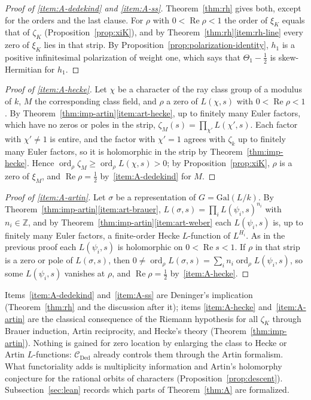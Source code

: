 \documentclass[11pt]{amsart}
\theoremstyle{plain}
\theoremstyle{definition}
\theoremstyle{remark}
\numberwithin{equation}{section}
\newcommand{\Z}{\mathbb{Z}}
\newcommand{\cC}{\mathcal{C}}
\DeclareMathOperator{\Rea}{Re}
\DeclareMathOperator{\ord}{ord}
\renewcommand{\Re}{\Rea}
\begin{document}
\begin{proof}[Proof of \ref{item:A-dedekind} and \ref{item:A-ss}]
Theorem~\ref{thm:rh} gives both, except for the orders and the last
clause. For $\rho$ with $0<\Re\rho<1$ the order of $\xi_K$ equals that
of $\zeta_K$ (Proposition~\ref{prop:xiK}), and by
Theorem~\ref{thm:rh}\ref{item:rh-line} every zero of $\xi_K$ lies in
that strip. By Proposition~\ref{prop:polarization-identity}, $h_1$ is a
positive infinitesimal polarization of weight one, which says that
$\Theta_1-\tfrac12$ is skew-Hermitian for $h_1$.
\end{proof}

\begin{proof}[Proof of \ref{item:A-hecke}]
Let $\chi$ be a character of the ray class group of a modulus of $k$,
$M$ the corresponding class field, and $\rho$ a zero of $L(\chi,s)$
with $0<\Re\rho<1$. By
Theorem~\ref{thm:imp-artin}\ref{item:art-hecke}, up to finitely many
Euler factors, which have no zeros or poles in the strip,
$\zeta_M(s)=\prod_{\chi'}L(\chi',s)$. Each factor with $\chi'\ne1$ is
entire, and the factor with $\chi'=1$ agrees with $\zeta_k$ up to
finitely many Euler factors, so it is holomorphic in the strip by
Theorem~\ref{thm:imp-hecke}. Hence $\ord_\rho\zeta_M\ge\ord_\rho
L(\chi,s)>0$; by Proposition~\ref{prop:xiK}, $\rho$ is a zero of
$\xi_M$, and $\Re\rho=\tfrac12$ by~\ref{item:A-dedekind} for $M$.
\end{proof}

\begin{proof}[Proof of \ref{item:A-artin}]
Let $\sigma$ be a representation of $G=\mathrm{Gal}(L/k)$. By
Theorem~\ref{thm:imp-artin}\ref{item:art-brauer}, $L(\sigma,s)=
\prod_iL(\psi_i,s)^{n_i}$ with $n_i\in\Z$, and
by Theorem~\ref{thm:imp-artin}\ref{item:art-weber} each
$L(\psi_i,s)$ is, up to finitely many
Euler factors, a finite-order Hecke $L$-function of $L^{H_i}$. As in
the previous proof each $L(\psi_i,s)$ is holomorphic on $0<\Re s<1$. If
$\rho$ in that strip is a zero or pole of $L(\sigma,s)$, then
$0\ne\ord_\rho L(\sigma,s)=\sum_in_i\ord_\rho L(\psi_i,s)$, so some
$L(\psi_i,s)$ vanishes at $\rho$, and $\Re\rho=\tfrac12$
by~\ref{item:A-hecke}.
\end{proof}

Items~\ref{item:A-dedekind} and~\ref{item:A-ss} are Deninger's
implication (Theorem~\ref{thm:rh} and the discussion after it); items
\ref{item:A-hecke} and~\ref{item:A-artin} are the classical
consequence of the Riemann hypothesis for all $\zeta_K$ through Brauer
induction, Artin reciprocity, and Hecke's theory
(Theorem~\ref{thm:imp-artin}).
Nothing is gained for zero location by enlarging the class to Hecke or
Artin $L$-functions: $\cC_{\mathrm{Ded}}$ already controls them through
the Artin formalism. What functoriality adds is multiplicity information
and Artin's holomorphy conjecture for the rational orbits of characters
(Proposition~\ref{prop:descent}).
Subsection~\ref{sec:lean} records which parts of Theorem~\ref{thm:A} are
formalized.
\end{document}
